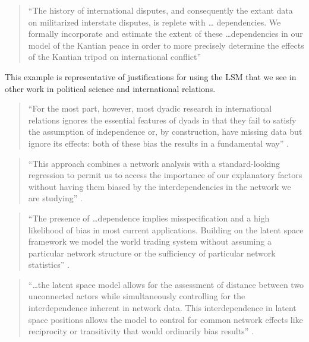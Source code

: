 \documentclass[11pt]{article}
\begin{document}
\begin{quote}
``The history of international disputes, and consequently the extant
  data on militarized interstate disputes, is replete with \ldots
  dependencies. We formally incorporate and estimate the extent of
  these \ldots dependencies in our model of the Kantian peace in order
  to more precisely determine the effects of the Kantian tripod on
  international conflict'' \citep[p. 585]{ward2007disputes}
\end{quote}

This example is representative of justifications for using the LSM that we see in other work in political science and international relations.

\begin{quote}
``For the most part, however, most dyadic research in international
  relations ignores the essential features of dyads in that they fail
  to satisfy the assumption of independence or, by construction, have
  missing data but ignore its effects: both of these bias the results
  in a fundamental way'' \citep[p. 2]{dorff2013networks}.
\end{quote}

\begin{quote}
``This approach combines a network analysis with a standard-looking
  regression to permit us to access the importance of our explanatory
  factors without having them biased by the interdependencies in the
  network we are studying'' \citep[p. 15]{cao2013democracies}.
\end{quote}

\begin{quote}
``The presence of \ldots dependence implies misspecification and a
  high likelihood of bias in most current applications. Building on
  the latent space framework we model the world trading system without
  assuming a particular network structure or the sufficiency of
  particular network statistics'' \citep[p. 20]{ward2013gravity}.
\end{quote}

\begin{quote}
``\ldots the latent space model allows for the assessment of distance
  between two unconnected actors while simultaneously controlling for
  the interdependence inherent in network data. This interdependence
  in latent space positions allows the model to control for common
  network effects like reciprocity or transitivity that would
  ordinarily bias results'' \citep[p. 336]{kirkland2012multimember}.
\end{quote}
\end{document}
